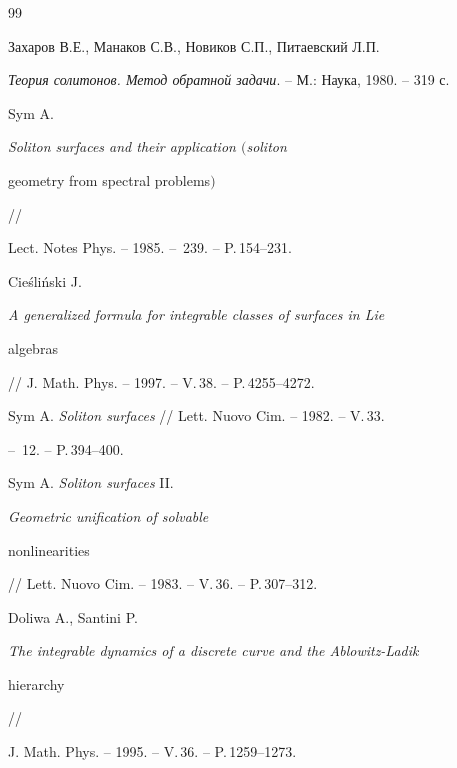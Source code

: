 \begin{thebibliography}{99}







Захаров В.Е., Манаков С.В., Новиков С.П., Питаевский Л.П. 


{\it Теория солитонов. Метод обратной задачи}. -- М.: Наука, 1980. -- 319 с.







Sym A. {\em Soliton surfaces and their application $($soliton 


geometry from spectral problems$)$} // 


Lect. Notes Phys. -- 1985. -- \No\,239. -- P.\,154--231.







Cie\'sli\'nski J.


{\em A generalized formula for integrable classes of surfaces in Lie


algebras} // J. Math. Phys. -- 1997. -- V.\,38. -- P.\,4255--4272.







Sym A. {\it Soliton surfaces} // Lett. Nuovo Cim. -- 1982. -- V.\,33.


-- \No\,12. -- P.\,394--400.







Sym A. {\em Soliton surfaces} II. {\em Geometric unification of solvable 


nonlinearities} // Lett. Nuovo Cim. -- 1983. -- V.\,36. -- P.\,307--312.







Doliwa A., Santini P.


{\em The integrable dynamics of a discrete curve and the Ablowitz-Ladik


hierarchy} // 


J. Math. Phys. -- 1995. -- V.\,36. -- P.\,1259--1273.


 





\end{thebibliography}
